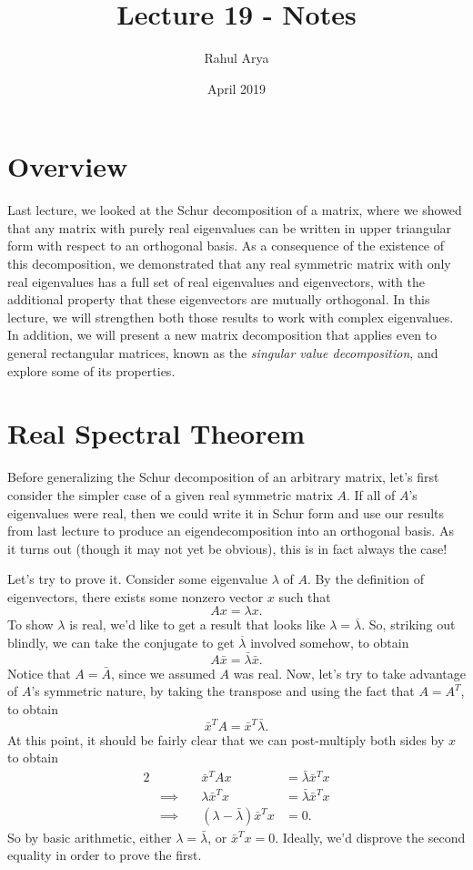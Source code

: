 \documentclass[letterpaper]{article}
\title{Lecture 19 - Notes}
\author{Rahul Arya}
\date{April 2019}
\theoremstyle{remark}
\newcommand{\eqn}[1]{\begin{alignat*}{2}#1\end{alignat*}}
\newcommand*{\thus}{&\implies\quad&}
\begin{document}
\maketitle

\section{Overview}
Last lecture, we looked at the Schur decomposition of a matrix, where we showed that any matrix with purely real eigenvalues can be written in upper triangular form with respect to an orthogonal basis. As a consequence of the existence of this decomposition, we demonstrated that any real symmetric matrix with only real eigenvalues has a full set of real eigenvalues and eigenvectors, with the additional property that these eigenvectors are mutually orthogonal. In this lecture, we will strengthen both those results to work with complex eigenvalues. In addition, we will present a new matrix decomposition that applies even to general rectangular matrices, known as the \emph{singular value decomposition}, and explore some of its properties.

\section{Real Spectral Theorem}
Before generalizing the Schur decomposition of an arbitrary matrix, let's first consider the simpler case of a given real symmetric matrix $A$. If all of $A$'s eigenvalues were real, then we could write it in Schur form and use our results from last lecture to produce an eigendecomposition into an orthogonal basis. As it turns out (though it may not yet be obvious), this is in fact always the case!

Let's try to prove it. Consider some eigenvalue $\lambda$ of $A$. By the definition of eigenvectors, there exists some nonzero vector $x$ such that
\[
    Ax = \lambda x.
\]
To show $\lambda$ is real, we'd like to get a result that looks like $\lambda = \overline{\lambda}$. So, striking out blindly, we can take the conjugate to get $\overline{\lambda}$ involved somehow, to obtain
\[
    A\bar{x} = \bar{\lambda} \bar{x}.
\]
Notice that $A = \bar{A}$, since we assumed $A$ was real. Now, let's try to take advantage of $A$'s symmetric nature, by taking the transpose and using the fact that $A = A^T$, to obtain
\[
    \bar{x}^TA = \bar{x}^T\bar{\lambda}.
\]
At this point, it should be fairly clear that we can post-multiply both sides by $x$ to obtain
\eqn{
    && \bar{x}^TAx &= \bar{\lambda}\bar{x}^Tx \\
    \thus \lambda \bar{x}^Tx &= \bar{\lambda}\bar{x}^T x \\
    \thus (\lambda - \bar{\lambda})\bar{x}^Tx &= 0.
}
So by basic arithmetic, either $\lambda = \bar{\lambda}$, or $\bar{x}^Tx = 0$. Ideally, we'd disprove the second equality in order to prove the first.
\end{document}
